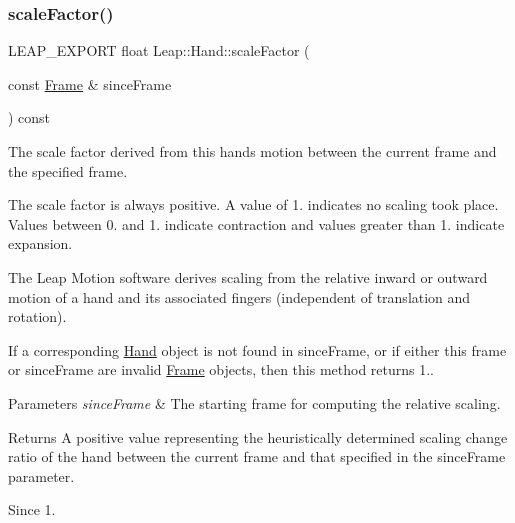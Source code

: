 \subsubsection{\texorpdfstring{scale\+Factor()}{scaleFactor()}}
{\footnotesize\ttfamily L\+E\+A\+P\+\_\+\+E\+X\+P\+O\+RT float Leap\+::\+Hand\+::scale\+Factor (\begin{DoxyParamCaption}\item[{const \hyperlink{class_leap_1_1_frame}{Frame} \&}]{since\+Frame }\end{DoxyParamCaption}) const}

The scale factor derived from this hand\textquotesingle{}s motion between the current frame and the specified frame.

The scale factor is always positive. A value of 1. indicates no scaling took place. Values between 0. and 1. indicate contraction and values greater than 1. indicate expansion.


\begin{DoxyCodeInclude}
\end{DoxyCodeInclude}


The Leap Motion software derives scaling from the relative inward or outward motion of a hand and its associated fingers (independent of translation and rotation).

If a corresponding \hyperlink{class_leap_1_1_hand}{Hand} object is not found in since\+Frame, or if either this frame or since\+Frame are invalid \hyperlink{class_leap_1_1_frame}{Frame} objects, then this method returns 1..


\begin{DoxyParams}{Parameters}
{\em since\+Frame} & The starting frame for computing the relative scaling. \\
\hline
\end{DoxyParams}
\begin{DoxyReturn}{Returns}
A positive value representing the heuristically determined scaling change ratio of the hand between the current frame and that specified in the since\+Frame parameter. 
\end{DoxyReturn}
\begin{DoxySince}{Since}
1. 
\end{DoxySince}
\mbox{\label{class_leap_1_1_hand_a62e912199ab38b96702afd6eb63b34e0}} 
